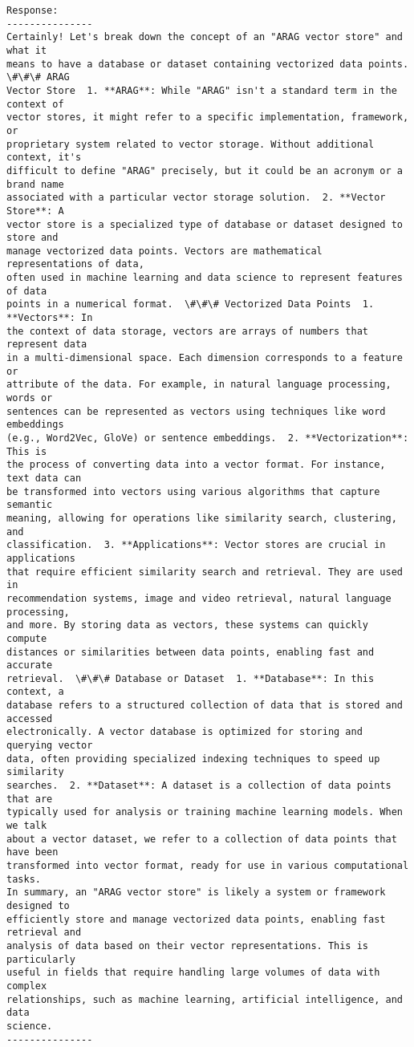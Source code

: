 \documentclass[11pt]{article}
\begin{document}
    \begin{Verbatim}[commandchars=\\\{\}]
Response:
---------------
Certainly! Let's break down the concept of an "ARAG vector store" and what it
means to have a database or dataset containing vectorized data points.  \#\#\# ARAG
Vector Store  1. **ARAG**: While "ARAG" isn't a standard term in the context of
vector stores, it might refer to a specific implementation, framework, or
proprietary system related to vector storage. Without additional context, it's
difficult to define "ARAG" precisely, but it could be an acronym or a brand name
associated with a particular vector storage solution.  2. **Vector Store**: A
vector store is a specialized type of database or dataset designed to store and
manage vectorized data points. Vectors are mathematical representations of data,
often used in machine learning and data science to represent features of data
points in a numerical format.  \#\#\# Vectorized Data Points  1. **Vectors**: In
the context of data storage, vectors are arrays of numbers that represent data
in a multi-dimensional space. Each dimension corresponds to a feature or
attribute of the data. For example, in natural language processing, words or
sentences can be represented as vectors using techniques like word embeddings
(e.g., Word2Vec, GloVe) or sentence embeddings.  2. **Vectorization**: This is
the process of converting data into a vector format. For instance, text data can
be transformed into vectors using various algorithms that capture semantic
meaning, allowing for operations like similarity search, clustering, and
classification.  3. **Applications**: Vector stores are crucial in applications
that require efficient similarity search and retrieval. They are used in
recommendation systems, image and video retrieval, natural language processing,
and more. By storing data as vectors, these systems can quickly compute
distances or similarities between data points, enabling fast and accurate
retrieval.  \#\#\# Database or Dataset  1. **Database**: In this context, a
database refers to a structured collection of data that is stored and accessed
electronically. A vector database is optimized for storing and querying vector
data, often providing specialized indexing techniques to speed up similarity
searches.  2. **Dataset**: A dataset is a collection of data points that are
typically used for analysis or training machine learning models. When we talk
about a vector dataset, we refer to a collection of data points that have been
transformed into vector format, ready for use in various computational tasks.
In summary, an "ARAG vector store" is likely a system or framework designed to
efficiently store and manage vectorized data points, enabling fast retrieval and
analysis of data based on their vector representations. This is particularly
useful in fields that require handling large volumes of data with complex
relationships, such as machine learning, artificial intelligence, and data
science.
---------------

    \end{Verbatim}
\end{document}
